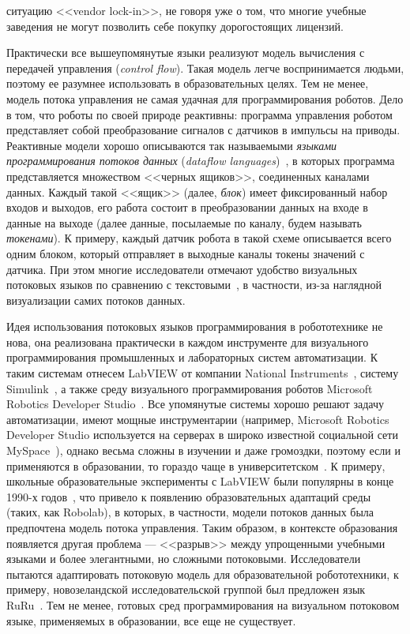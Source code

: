 \documentclass[a5paper]{article}
\begin{document}
ситуацию <<vendor lock-in>>, не говоря уже о том, что многие учебные заведения не могут позволить себе покупку дорогостоящих лицензий. 

Практически все вышеупомянутые языки реализуют модель вычисления с передачей управления (\textit{control flow}). Такая модель легче воспринимается людьми, поэтому ее разумнее использовать в образовательных целях. Тем не менее, модель потока управления не самая удачная для программирования роботов. Дело в том, что роботы по своей природе реактивны: программа управления роботом представляет собой преобразование сигналов с датчиков в импульсы на приводы. Реактивные модели хорошо описываются так называемыми \textit{языками программирования потоков данных} (\textit{dataflow languages})~\cite{johnston2004advances}, в которых программа представляется множеством <<черных ящиков>>, соединенных каналами данных. Каждый такой <<ящик>> (далее, \textit{блок}) имеет фиксированный набор входов и выходов, его работа состоит в преобразовании данных на входе в данные на выходе (далее данные, посылаемые по каналу, будем называть \textit{токенами}). К примеру, каждый датчик робота в такой схеме описывается всего одним блоком, который отправляет в выходные каналы токены значений с датчика. При этом многие исследователи отмечают удобство визуальных потоковых языков по сравнению с текстовыми~\cite{johnston2004advances}, в частности, из-за наглядной визуализации самих потоков данных.

Идея использования потоковых языков программирования в робототехнике не нова, она реализована практически в каждом инструменте для визуального программирования промышленных и лабораторных систем автоматизации. К таким системам отнесем LabVIEW от компании National Instruments~\cite{kodosky1991visual}, систему Simulink~\cite{dabney2004mastering}, а также среду визуального программирования роботов Microsoft Robotics Developer Studio~\cite{jackson2007microsoft}. Все упомянутые системы хорошо решают задачу автоматизации, имеют мощные инструментарии (например, Microsoft Robotics Developer Studio используется на серверах в широко известной социальной сети MySpace~\cite{scherotter2009ccr}), однако весьма сложны в изучении и даже громоздки, поэтому если и применяются в образовании, то гораздо чаще в университетском~\cite{stefanovic2011labview,yi2005labview}. К примеру, школьные образовательные эксперименты с LabVIEW были популярны в конце 1990-х годов~\cite{cyr1997low,portsmore1999robolab}, что привело к появлению образовательных адаптаций среды (таких, как Robolab), в которых, в частности, модели потоков данных была предпочтена модель потока управления. Таким образом, в контексте образования появляется другая проблема --- <<разрыв>> между упрощенными учебными языками и более элегантными, но сложными потоковыми. Исследователи пытаются адаптировать потоковую модель для образовательной робототехники,     к примеру, новозеландской исследовательской группой был предложен язык RuRu~\cite{diprose2011ruru}. Тем не менее, готовых сред программирования на визуальном потоковом языке, применяемых в образовании, все еще не существует.
\end{document}
